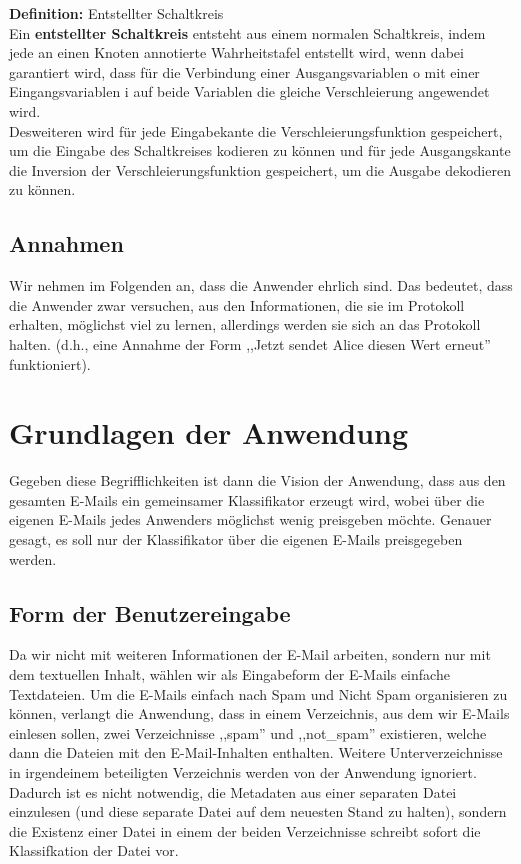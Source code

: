 \documentclass{article}
\newenvironment{definition}
    [1]
    {
        {\bf Definition:} #1\\
    }
    {}
\newcommand{\defined}
    [1]
    {
        {\bf #1}
    }
\begin{document}
\begin{definition}{Entstellter Schaltkreis}
Ein \defined{entstellter Schaltkreis} entsteht aus einem normalen Schaltkreis,
 indem jede an einen Knoten annotierte Wahrheitstafel entstellt wird, wenn
 dabei garantiert wird, dass f\"ur die Verbindung einer Ausgangsvariablen
 o mit einer Eingangsvariablen i auf beide Variablen die gleiche
 Verschleierung angewendet wird.\\
Desweiteren wird f\"ur jede Eingabekante die Verschleierungsfunktion
 gespeichert, um die Eingabe des Schaltkreises kodieren zu k\"onnen und
 f\"ur jede Ausgangskante die Inversion der Verschleierungsfunktion
 gespeichert, um die Ausgabe dekodieren zu k\"onnen.
\end{definition}
\subsection{Annahmen}
Wir nehmen im Folgenden an, dass die Anwender ehrlich sind.
Das bedeutet, dass die Anwender zwar versuchen, aus den Informationen,
die sie im Protokoll erhalten, m\"oglichst viel zu lernen, allerdings
werden sie sich an das Protokoll halten. (d.h., eine Annahme der Form
,,Jetzt sendet Alice diesen Wert erneut'' funktioniert).

\pagebreak
\section{Grundlagen der Anwendung}
Gegeben diese Begrifflichkeiten ist dann die Vision der Anwendung, dass
aus den gesamten E-Mails ein gemeinsamer Klassifikator erzeugt wird,
wobei \"uber die eigenen E-Mails jedes Anwenders m\"oglichst wenig preisgeben
m\"ochte. Genauer gesagt, es soll nur der Klassifikator \"uber die eigenen 
E-Mails preisgegeben werden.

\subsection{Form der Benutzereingabe}
Da wir nicht mit weiteren Informationen der E-Mail arbeiten, sondern nur mit
dem textuellen Inhalt, w\"ahlen wir als Eingabeform der E-Mails einfache
Textdateien. Um die E-Mails einfach nach Spam und Nicht Spam organisieren
zu k\"onnen, verlangt die Anwendung, dass in einem Verzeichnis, aus
dem wir E-Mails einlesen sollen, zwei  Verzeichnisse ,,spam'' und ,,not\_spam'' 
existieren, welche dann die Dateien mit den E-Mail-Inhalten enthalten.
Weitere Unterverzeichnisse in irgendeinem beteiligten Verzeichnis werden
von der Anwendung ignoriert. Dadurch ist es nicht notwendig, die Metadaten
aus einer separaten Datei einzulesen (und diese separate Datei auf dem
neuesten Stand zu halten), sondern die Existenz einer Datei in einem der
beiden Verzeichnisse schreibt sofort die Klassifkation der Datei vor.
\end{document}
